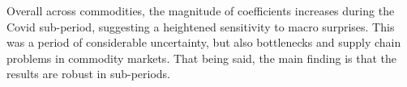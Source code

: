Overall across commodities, the magnitude of coefficients increases during the Covid sub-period, suggesting a heightened sensitivity to macro surprises. This was a period of considerable uncertainty, but also bottlenecks and supply chain problems in commodity markets. That being said, the main finding is that the results are robust in sub-periods.

